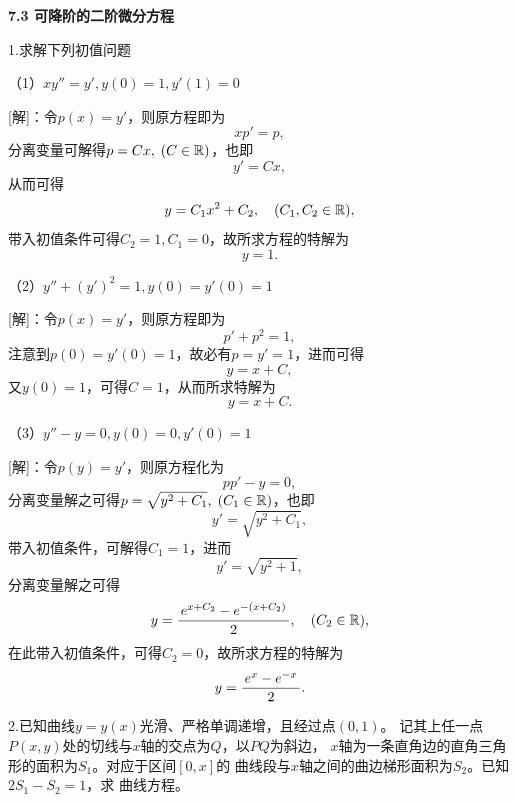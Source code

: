 \bs

\begin{center}
	\bf 7.3 可降阶的二阶微分方程
\end{center}

1.求解下列初值问题

（1）$xy''=y',y(0)=1,y'(1)=0$

[解]：令$p(x)=y'$，则原方程即为
$$xp'=p,$$
分离变量可解得$p=Cx,\;(C\in\mathbb{{R}})$，也即
$$y'=Cx,$$
从而可得
$$y=C_1x^2+C_2,\quad (C_1,C_2\in\mathbb{{R}}),$$
带入初值条件可得$C_2=1,C_1=0$，故所求方程的特解为
$$y=1.$$

\bs

（2）$y''+(y')^2=1,y(0)=y'(0)=1$

[解]：令$p(x)=y'$，则原方程即为
$$p'+p^2=1,$$
注意到$p(0)=y'(0)=1$，故必有$p=y'=1$，进而可得
$$y=x+C,$$
又$y(0)=1$，可得$C=1$，从而所求特解为
$$y=x+C.$$

\bs

（3）$y''-y=0,y(0)=0,y'(0)=1$

[解]：令$p(y)=y'$，则原方程化为
$$pp'-y=0,$$
分离变量解之可得$p=\sqrt{y^2+C_1},\;(C_1\in\mathbb{{R}})$，也即
$$y'=\sqrt{y^2+C_1},$$
带入初值条件，可解得$C_1=1$，进而
$$y'=\sqrt{y^2+1},$$
分离变量解之可得
$$y=\displaystyle\frac{\,{e^{x+C_2}-e^{-(x+C_2)}}\,}{\,{2}\,},\quad (C_2\in\mathbb{{R}}),$$
在此带入初值条件，可得$C_2=0$，故所求方程的特解为
$$y=\displaystyle\frac{\,{e^x-e^{-x}}\,}{\,{2}\,}.$$
\fin

\bs

2.已知曲线$y=y(x)$光滑、严格单调递增，且经过点$(0,1)$。
记其上任一点$P(x,y)$处的切线与$x$轴的交点为$Q$，以$PQ$为斜边，
$x$轴为一条直角边的直角三角形的面积为$S_1$。对应于区间$[0,x]$的
曲线段与$x$轴之间的曲边梯形面积为$S_2$。已知$2S_1-S_2=1$，求
曲线方程。

